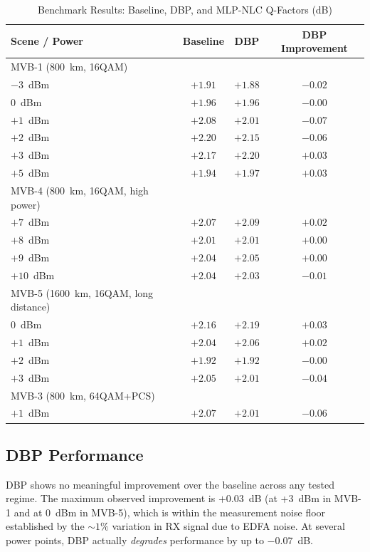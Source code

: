 \documentclass[conference]{IEEEtran}
\begin{document}
\begin{table}[htbp]
\caption{Benchmark Results: Baseline, DBP, and MLP-NLC Q-Factors (dB)}
\label{tab:results}
\begin{center}
\begin{tabular}{lccc}
\toprule
Scene / Power & Baseline & DBP & DBP Improvement \\
\midrule
MVB-1 (800~km, 16QAM) & & & \\
\quad $-3$~dBm & $+1.91$ & $+1.88$ & $-0.02$ \\
\quad $0$~dBm & $+1.96$ & $+1.96$ & $-0.00$ \\
\quad $+1$~dBm & $+2.08$ & $+2.01$ & $-0.07$ \\
\quad $+2$~dBm & $+2.20$ & $+2.15$ & $-0.06$ \\
\quad $+3$~dBm & $+2.17$ & $+2.20$ & $+0.03$ \\
\quad $+5$~dBm & $+1.94$ & $+1.97$ & $+0.03$ \\
\midrule
MVB-4 (800~km, 16QAM, high power) & & & \\
\quad $+7$~dBm & $+2.07$ & $+2.09$ & $+0.02$ \\
\quad $+8$~dBm & $+2.01$ & $+2.01$ & $+0.00$ \\
\quad $+9$~dBm & $+2.04$ & $+2.05$ & $+0.00$ \\
\quad $+10$~dBm & $+2.04$ & $+2.03$ & $-0.01$ \\
\midrule
MVB-5 (1600~km, 16QAM, long distance) & & & \\
\quad $0$~dBm & $+2.16$ & $+2.19$ & $+0.03$ \\
\quad $+1$~dBm & $+2.04$ & $+2.06$ & $+0.02$ \\
\quad $+2$~dBm & $+1.92$ & $+1.92$ & $-0.00$ \\
\quad $+3$~dBm & $+2.05$ & $+2.01$ & $-0.04$ \\
\midrule
MVB-3 (800~km, 64QAM+PCS) & & & \\
\quad $+1$~dBm & $+2.07$ & $+2.01$ & $-0.06$ \\
\bottomrule
\end{tabular}
\end{center}
\end{table}

\subsection{DBP Performance}

DBP shows no meaningful improvement over the baseline across any tested regime. The maximum observed improvement is $+0.03$~dB (at +3~dBm in MVB-1 and at 0~dBm in MVB-5), which is within the measurement noise floor established by the $\sim 1\%$ variation in RX signal due to EDFA noise. At several power points, DBP actually \textit{degrades} performance by up to $-0.07$~dB.
\end{document}
